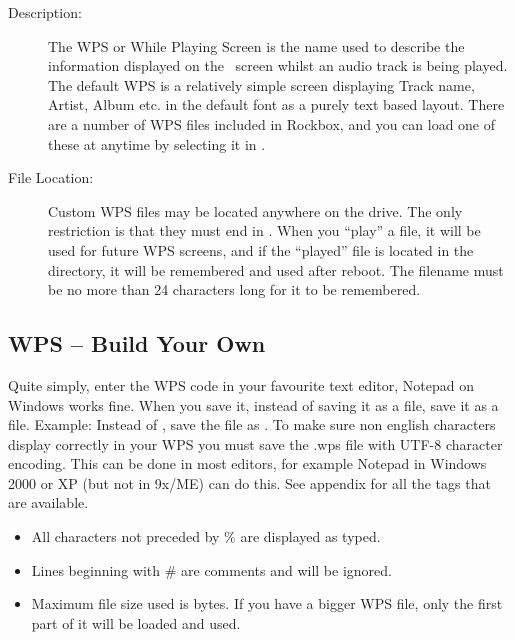\begin{description}
\item[Description: ] The WPS or While Playing Screen is the name used to 
  describe the information displayed on the \daps\ screen whilst an audio track
  is being played. The default WPS is a relatively simple screen displaying
  Track name, Artist, Album etc. in the default font as a purely text based
  layout. There are a number of WPS files included in Rockbox, and you can 
  load one of these at anytime by selecting it in
  .


\item [File Location: ]Custom WPS files may be located anywhere on the drive. 
  The only restriction is that they must end in . When you ``play''
  a  file, it will be used for future WPS screens, and if the 
  ``played''  file is located in the  directory, it 
  will be remembered and used after reboot. The  filename must be 
  no more than 24 characters long for it to be remembered.
\end{description}

\subsection{\label{ref:CreateYourOwnWPS}WPS -- Build Your Own}
Quite simply, enter the WPS code in your favourite text editor, Notepad on
Windows works fine. When you save it, instead of saving it as a  
file, save it as a  file. Example: Instead of , 
save the file as . To make sure non english characters 
display correctly in your WPS you must save the .wps file with UTF-8 character 
encoding. This can be done in most editors, for example Notepad in Windows 2000
or XP (but not in 9x/ME) can do this. See appendix  for
all the tags that are available.

\begin{itemize}
\item All characters not preceded by \% are displayed as typed.
\item Lines beginning with \# are comments and will be ignored.
\item Maximum file size used is 
   bytes.
  If you have a bigger WPS file, only the first part of it will be 
  loaded and used.
\end{itemize}


